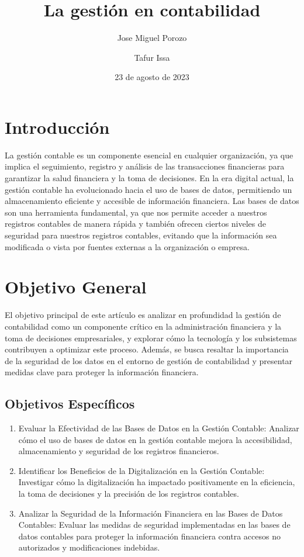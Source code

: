 \documentclass{article}
\title{La gestión en contabilidad}
\author{Jose Miguel Porozo \and Tafur Issa}
\date{23 de agosto de 2023}
\begin{document}
\maketitle

\section{Introducción}
La gestión contable es un componente esencial en cualquier organización, ya que implica el seguimiento, registro y análisis de las transacciones financieras para garantizar la salud financiera y la toma de decisiones. En la era digital actual, la gestión contable ha evolucionado hacia el uso de bases de datos, permitiendo un almacenamiento eficiente y accesible de información financiera. Las bases de datos son una herramienta fundamental, ya que nos permite acceder a nuestros registros contables de manera rápida y también ofrecen ciertos niveles de seguridad para nuestros registros contables, evitando que la información sea modificada o vista por fuentes externas a la organización o empresa.

\section{Objetivo General}
El objetivo principal de este artículo es analizar en profundidad la gestión de contabilidad como un componente crítico en la administración financiera y la toma de decisiones empresariales, y explorar cómo la tecnología y los subsistemas contribuyen a optimizar este proceso. Además, se busca resaltar la importancia de la seguridad de los datos en el entorno de gestión de contabilidad y presentar medidas clave para proteger la información financiera.

\subsection{Objetivos Específicos}
\begin{enumerate}
    \item Evaluar la Efectividad de las Bases de Datos en la Gestión Contable: Analizar cómo el uso de bases de datos en la gestión contable mejora la accesibilidad, almacenamiento y seguridad de los registros financieros.
    
    \item Identificar los Beneficios de la Digitalización en la Gestión Contable: Investigar cómo la digitalización ha impactado positivamente en la eficiencia, la toma de decisiones y la precisión de los registros contables.
    
    \item Analizar la Seguridad de la Información Financiera en las Bases de Datos Contables: Evaluar las medidas de seguridad implementadas en las bases de datos contables para proteger la información financiera contra accesos no autorizados y modificaciones indebidas.
\end{enumerate}
\end{document}
